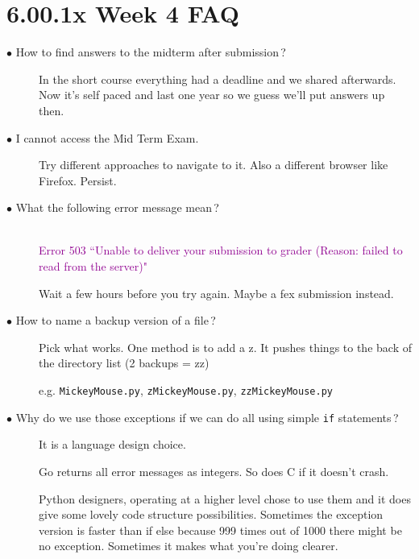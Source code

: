 \documentclass{article}
\newcommand{\inlinecode}[1]{\texttt{#1}}
\newcommand{\question}[1]{\item[$\bullet$ #1] \hfil}
\newenvironment{answer}{}{}
\newenvironment{faq}{\begin{description}}{\end{description}}
\begin{document}
	
	\section*{\Huge6.00.1x Week 4 FAQ}
	
	\begin{faq}
		\question{How to find answers to the midterm after submission\,?}
		
		\begin{answer}
			In the short course everything had a deadline and we shared afterwards. Now it's self paced and last one year so we guess we'll put answers up then.
		\end{answer}
		
		\question{I cannot access the Mid Term Exam.}
		
		\begin{answer}
			Try different approaches to navigate to it. Also a different browser like Firefox. Persist.
		\end{answer}
		
		\question{What the following error message mean\,?} \ \\
		\textcolor[HTML]{900090}{Error 503 ``Unable to deliver your submission to grader (Reason: failed to read from the server)"}
		
		\begin{answer}
			Wait a few hours before you try again. Maybe a fex submission instead.
		\end{answer}
		
		\question{How to name a backup version of a file\,?}
		
		\begin{answer}
			Pick what works. One method is to add a z. It pushes things to the back of the directory list (2 backups = zz)
			
			e.g. \inlinecode{MickeyMouse.py}, \inlinecode{zMickeyMouse.py}, \inlinecode{zzMickeyMouse.py}
		\end{answer}
		
		\question{Why do we use those exceptions if we can do all using simple \inlinecode{if} statements\,?}
		
		\begin{answer}
			It is a language design choice.
			
			Go returns all error messages as integers. So does C if it doesn't crash.
			
			Python designers, operating at a higher level chose to use them and it does give some lovely code structure possibilities. Sometimes the exception version is faster than if else because 999 times out of 1000 there might be no exception. Sometimes it makes what you're doing clearer.
		\end{answer}
		

\end{faq}
\end{document}
